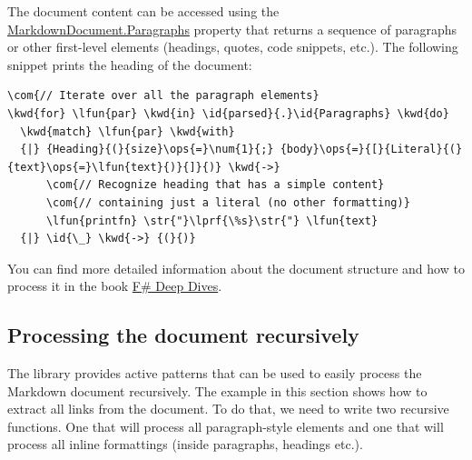 \documentclass{article}
\newcommand{\id}[1]{\textcolor{black}{#1}}
\newcommand{\com}[1]{\textcolor{officegreen}{#1}}
\newcommand{\kwd}[1]{\textcolor{navy}{#1}}
\newcommand{\num}[1]{\textcolor{officegreen}{#1}}
\newcommand{\ops}[1]{\textcolor{purple}{#1}}
\newcommand{\str}[1]{\textcolor{olive}{#1}}
\begin{document}
The document content can be accessed using the \href{https://fsprojects.github.io/FSharp.Formatting/reference/fsharp-formatting-markdown-markdowndocument.html\#Paragraphs}{MarkdownDocument.Paragraphs} property that returns
a sequence of paragraphs or other first-level elements (headings, quotes, code snippets, etc.).
The following snippet prints the heading of the document:
\begin{Verbatim}[commandchars=\\\{\}]
\com{// Iterate over all the paragraph elements}
\kwd{for} \lfun{par} \kwd{in} \id{parsed}{.}\id{Paragraphs} \kwd{do}
  \kwd{match} \lfun{par} \kwd{with}
  {|} {Heading}{(}{size}\ops{=}\num{1}{;} {body}\ops{=}{[}{Literal}{(}{text}\ops{=}\lfun{text}{)}{]}{)} \kwd{->} 
      \com{// Recognize heading that has a simple content}
      \com{// containing just a literal (no other formatting)}
      \lfun{printfn} \str{"}\lprf{\%s}\str{"} \lfun{text}
  {|} \id{\_} \kwd{->} {(}{)}
\end{Verbatim}



You can find more detailed information about the document structure and how to process it
in the book \href{http://manning.com/petricek2/}{F\# Deep Dives}.
\subsection*{Processing the document recursively}



The library provides active patterns that can be used to easily process the Markdown
document recursively. The example in this section shows how to extract all links from the
document. To do that, we need to write two recursive functions. One that will process
all paragraph-style elements and one that will process all inline formattings (inside
paragraphs, headings etc.).
\end{document}
